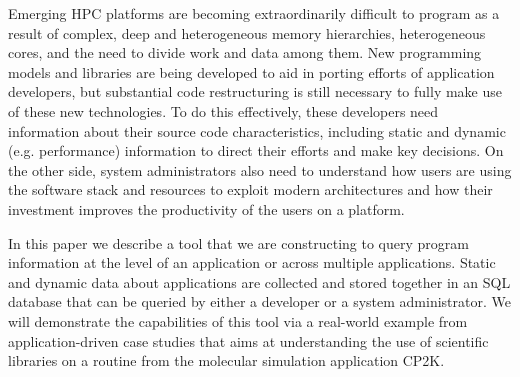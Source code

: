 Emerging HPC platforms are becoming extraordinarily difficult to program as a result of complex, deep and heterogeneous memory hierarchies, heterogeneous cores, and the need to divide work and data among them.
New programming models and libraries are being developed to aid in porting efforts of application developers, but substantial code restructuring is still necessary to fully make use of these new technologies.
To do this effectively, these developers need information about their source code characteristics, including static and dynamic (e.g. performance) information to direct their efforts and make key decisions.
On the other side, system administrators also need to understand how users are using the software stack and resources to exploit modern architectures and how their investment improves the productivity of the users on a platform.

In this paper we describe a tool that we are constructing to query program information at the level of an application or across multiple applications.
Static and dynamic data about applications are collected and stored together in an \acs{SQL} database that can be queried by either a developer or a system administrator.
We will demonstrate the capabilities of this tool via a real-world example from application-driven case studies that aims at understanding the use of scientific libraries on a routine from the molecular simulation application CP2K.
